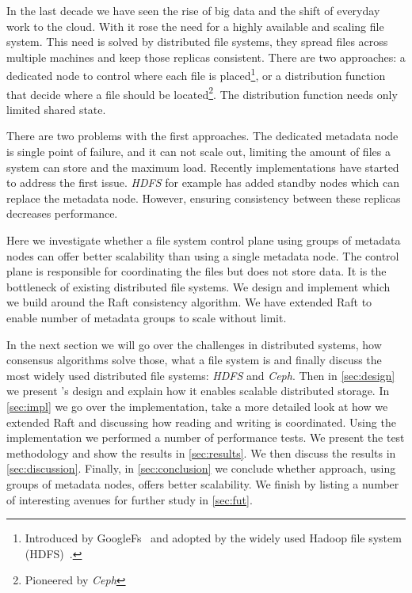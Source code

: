 In the last decade we have seen the rise of big data and the shift of everyday work to the cloud. With it rose the need for a highly available and scaling file system. This need is solved by distributed file systems, they spread files across multiple machines and keep those replicas consistent. There are two approaches: a dedicated node to control where each file is placed\footnote{Introduced by GoogleFs~\cite{GFS,GFS_interview} and adopted by the widely used Hadoop file system (HDFS)~\cite{hdfs}.}, or a distribution function that decide where a file should be located\footnote{Pioneered by \textit{Ceph}\cite{ceph}}. The distribution function needs only limited shared state.

There are two problems with the first approaches. The dedicated metadata node is single point of failure, and it can not scale out, limiting the amount of files a system can store and the maximum load. Recently implementations have started to address the first issue. \textit{HDFS} for example has added standby nodes \cite{hdfs_ha_nfs, hdfs_ha_q} which can replace the metadata node. However, ensuring consistency between these replicas decreases performance. 


Here we investigate whether a file system control plane using groups of metadata nodes can offer better scalability than using a single metadata node. The control plane is responsible for coordinating the files but does not store data. It is the bottleneck of existing distributed file systems. We design and implement \Name{} which we build around the Raft\cite{raft} consistency algorithm. We have extended Raft to enable number of metadata groups to scale without limit. 

In the next section we will go over the challenges in distributed systems, how consensus algorithms solve those, what a file system is and finally discuss the most widely used distributed file systems: \textit{HDFS} and \textit{Ceph}. 
%
Then in \cref{sec:design} we present \name{}'s design and explain how it enables scalable distributed storage.
%
In \cref{sec:impl} we go over the implementation, take a more detailed look at how we extended Raft and discussing how reading and writing is coordinated.
%
Using the \name{} implementation we performed a number of performance tests. We present the test methodology and show the results in \cref{sec:results}.
% 
We then discuss the results in \cref{sec:discussion}.
%
Finally, in \cref{sec:conclusion} we conclude whether \name{} approach, using groups of metadata nodes, offers better scalability. 
%
We finish by listing a number of interesting avenues for further study in \cref{sec:fut}.
